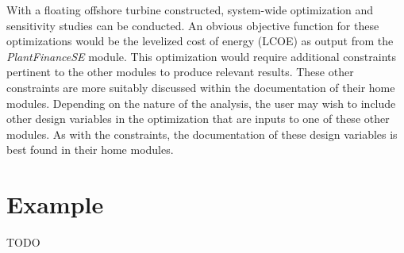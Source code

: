 With a floating offshore turbine constructed, system-wide optimization
and sensitivity studies can be conducted.  An obvious objective function
for these optimizations would be the levelized cost of energy (LCOE) as
output from the \textit{PlantFinanceSE} module.  This optimization would
require additional constraints pertinent to the other modules to produce
relevant results.  These other constraints are more suitably discussed
within the documentation of their home modules.  Depending on the nature
of the analysis, the user may wish to include other design variables in
the optimization that are inputs to one of these other modules.  As with
the constraints, the documentation of these design variables is best
found in their home modules.

\section{Example}
TODO
